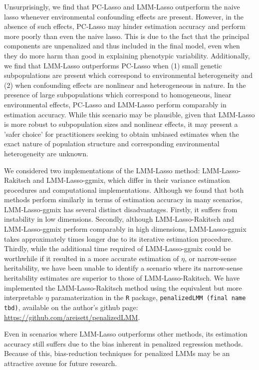 Unsurprisingly, we find that PC-Lasso and LMM-Lasso outperform the naive lasso whenever environmental confounding effects are present. However, in the absence of such effects, PC-Lasso may hinder estimation accuracy and perform more poorly than even the naive lasso. This is due to the fact that the principal components are unpenalized and thus included in the final model, even when they do more harm than good in explaining phenotypic variability. Additionally, we find that LMM-Lasso outperforms PC-Lasso when (1) small genetic subpopulations are present which correspond to environmental heterogeneity and (2) when confounding effects are nonlinear and heterogeneous in nature. In the presence of large subpopulations which correspond to homogeneous, linear environmental effects, PC-Lasso and LMM-Lasso perform comparably in estimation accuracy. While this scenario may be plausible, given that LMM-Lasso is more robust to subpopulation sizes and nonlinear effects, it may present a 'safer choice' for practitioners seeking to obtain unbiased estimates when the exact nature of population structure and corresponding environmental heterogeneity are unknown.  

We considered two implementations of the LMM-Lasso method: LMM-Lasso-Rakitsch and LMM-Lasso-ggmix, which differ in their variance estimation procedures and computational implementations. Although we found that both methods perform similarly in terms of estimation accuracy in many scenarios, LMM-Lasso-ggmix has several distinct disadvantages. Firstly, it suffers from instability in low dimensions. Secondly, although LMM-Lasso-Rakitsch and LMM-Lasso-ggmix perform comparably in high dimensions, LMM-Lasso-ggmix takes approximately  times longer due to its iterative estimation procedure. Thirdly, while the additional time required of LMM-Lasso-ggmix could be worthwhile if it resulted in a more accurate estimation of $\eta$, or narrow-sense heritability, we have been unable to identify a scenario where its narrow-sense heritability estimates are superior to those of LMM-Lasso-Rakitsch. We have implemented the LMM-Lasso-Rakitsch method using the equivalent but more interpretable $\eta$ paramaterization in the \texttt{R} package, \texttt{penalizedLMM (final name tbd)}, available on the author's github page: \url{https://github.com/areisett/penalizedLMM}.

Even in scenarios where LMM-Lasso outperforms other methods, its estimation accuracy still suffers due to the bias inherent in penalized regression methods. Because of this, bias-reduction techniques for penalized LMMs may be an attractive avenue for future research.

